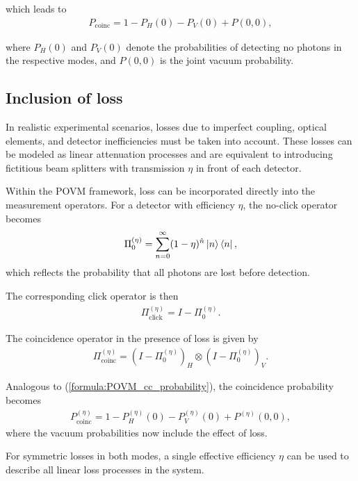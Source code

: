 \documentclass[%
 reprint,
 amsmath,amssymb,
 aps,
twocolumn
]{revtex4-2}
\begin{document}
which leads to
\begin{align}
P_{\text{coinc}} = 1 - P_H(0) - P_V(0) + P(0,0)\label{formula:POVM_cc_probability},
\end{align}

where $P_H(0)$ and $P_V(0)$ denote the probabilities of detecting no photons in the respective modes, and $P(0,0)$ is the joint vacuum probability. 

\subsection{Inclusion of loss}

In realistic experimental scenarios, losses due to imperfect coupling, optical elements, and detector inefficiencies must be taken into account. These losses can be modeled as linear attenuation processes and are equivalent to introducing fictitious beam splitters with transmission $\eta$ in front of each detector.

Within the POVM framework, loss can be incorporated directly into the measurement operators. For a detector with efficiency $\eta$, the no-click operator becomes
\begin{align}
\label{POVM:loss}
    \Pi_0^{(\eta)} = \sum_{n=0}^{\infty} (1-\eta)^{\hat n} \ket{n}\bra{n},
\end{align}
which reflects the probability that all photons are lost before detection.

The corresponding click operator is then
\begin{align}
    \Pi_{\text{click}}^{(\eta)} = I - \Pi_0^{(\eta)}.
\end{align}

The coincidence operator in the presence of loss is given by
\begin{align}
    \Pi_{\text{coinc}}^{(\eta)} = (I - \Pi_0^{(\eta)})_H \otimes (I - \Pi_0^{(\eta)})_V.
\end{align}

Analogous to (\ref{formula:POVM_cc_probability}), the coincidence probability becomes
\begin{align}
\label{POVM:coinc_prob_loss}
    P_{\text{coinc}}^{(\eta)} = 1 - P_H^{(\eta)}(0) - P_V^{(\eta)}(0) + P^{(\eta)}(0,0),
\end{align}
where the vacuum probabilities now include the effect of loss.

For symmetric losses in both modes, a single effective efficiency $\eta$ can be used to describe all linear loss processes in the system.
\end{document}
